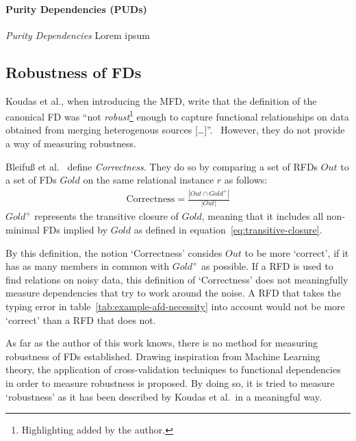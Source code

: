 \paragraph{Purity Dependencies (PUDs)}
\emph{Purity Dependencies} Lorem ipsum

\subsection{Robustness of FDs}
Koudas et al., when introducing the MFD, write that the definition of the canonical FD was ``not \emph{robust}\footnote{Highlighting added by the author.} enough to capture functional relationships on data obtained from merging heterogenous sources [\dots]''.~\cite[p.~1]{KOU09}
However, they do not provide a way of measuring robustness.

Bleifuß et al.~\cite[p.~3]{BLE16} define \emph{Correctness}.
They do so by comparing a set of RFDs \( Out \) to a set of FDs \( Gold \) on the same relational instance \( r \) as follows:
\begin{align*}
    \text{Correctness} = \frac{|Out \cap Gold^{+}|}{|Out|}
\end{align*}
\( Gold^{+} \) represents the transitive closure of \( Gold \), meaning that it includes all non-minimal FDs implied by \( Gold \) as defined in equation~\ref{eq:transitive-closure}.

By this definition, the notion `Correctness' consides \( Out \) to be more `correct', if it has as many members in common with \( Gold^{+} \) as possible.
If a RFD is used to find relations on noisy data, this definition of `Correctness' does not meaningfully measure dependencies that try to work around the noise.
A RFD that takes the typing error in table~\ref{tab:example-afd-necessity} into account would not be more `correct' than a RFD that does not.

As far as the author of this work knows, there is no method for measuring robustness of FDs established.
Drawing inspiration from Machine Learning theory, the application of cross-validation techniques to functional dependencies in order to measure robustness is proposed.
By doing so, it is tried to measure `robustness' as it has been described by Koudas et al.\ in a meaningful way.


